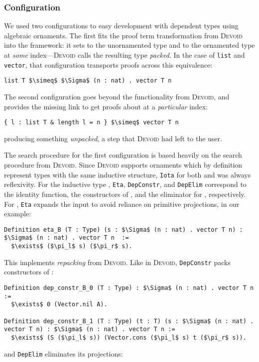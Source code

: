 \subsubsection{Configuration}

We used two configurations to easy development with dependent types using algebraic ornaments.
The first fits the proof term transformation from \textsc{Devoid} into the \toolname framework:
it sets \A to the unornamented type and \B to the ornamented type at \textit{some} index---\textsc{Devoid}
calls the resulting type \textit{packed}.
In the case of \lstinline{list} and \lstinline{vector}, that configuration
transports proofs across this equivalence:

\begin{lstlisting}
list T $\simeq$ $\Sigma$ (n : nat) . vector T n
\end{lstlisting}
The second configuration goes beyond the functionality from \textsc{Devoid}, and provides
the missing link to get proofs about \B at a \textit{particular} index:

\begin{lstlisting}
{ l : list T & length l = n } $\simeq$ vector T n
\end{lstlisting}
producing something \textit{unpacked},
a step that \textsc{Devoid} had left to the user.

The search procedure for the first configuration is based heavily on the search procedure from \textsc{Devoid}.
Since \textsc{Devoid} supports ornaments which by definition represent types with the same inductive structure,
\lstinline{Iota} for both \A and \B was always reflexivity.
For the inductive type \A, \lstinline{Eta}, \lstinline{DepConstr}, and \lstinline{DepElim}
correspond to the identity function, the constructors of \A, and the eliminator for \A, respectively.
For \B, \lstinline{Eta} expands the input to avoid reliance on primitive projections,
in our example:

\begin{lstlisting}
Definition eta_B (T : Type) (s : $\Sigma$ (n : nat) . vector T n) : $\Sigma$ (n : nat) . vector T n  :=
  $\exists$ ($\pi_l$ s) ($\pi_r$ s).
\end{lstlisting}
This implements \textit{repacking} from \textsc{Devoid}.
Like in \textsc{Devoid},
\lstinline{DepConstr} packs constructors of \B: %

\begin{lstlisting}
Definition dep_constr_B_0 (T : Type) : $\Sigma$ (n : nat) . vector T n :=
  $\exists$ 0 (Vector.nil A).

Definition dep_constr_B_1 (T : Type) (t : T) (s : $\Sigma$ (n : nat) . vector T n) : $\Sigma$ (n : nat) . vector T n :=
  $\exists$ (S ($\pi_l$ s)) (Vector.cons ($\pi_l$ s) t ($\pi_r$ s)).
\end{lstlisting}
and \lstinline{DepElim} eliminates its projections:

